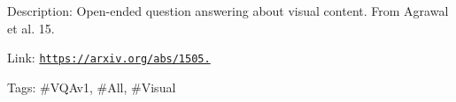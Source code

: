 Description\+: Open-\/ended question answering about visual content. From Agrawal et al. \textquotesingle{}15.

Link\+: \href{https://arxiv.org/abs/1505.00468}{\tt https\+://arxiv.\+org/abs/1505.}

Tags\+: \#\+V\+Q\+Av1, \#\+All, \#\+Visual 
